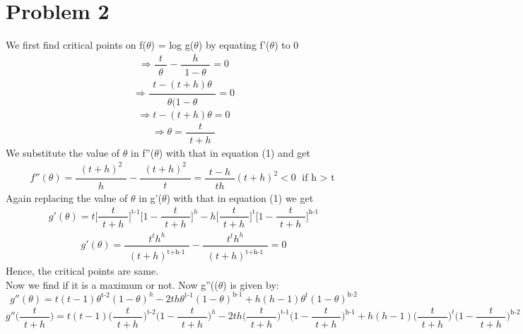 \documentclass[11pt, a4paper, fleqn]{article}
\begin{document}
\section{Problem 2}
We first find critical points on f($\theta$) = log g($\theta$) by equating f'($\theta$) to 0
\begin{equation*}
\Rightarrow \frac{\substack{t}}{\substack{\theta}} - \frac{\substack{h}}{\substack{1 - \theta}} = 0
\end{equation*}
\begin{equation*}
\Rightarrow \frac{\substack{t - (t+h)\theta}}{\substack{\theta (1-\theta}} = 0
\end{equation*}
\begin{equation*}
\Rightarrow t-(t+h)\theta = 0
\end{equation*}
\begin{equation}
\Rightarrow \theta = \frac{\substack{t}}{\substack{t+h}}
\end{equation}
We substitute the value of $\theta$ in f''($\theta$) with that in equation (1) and get
\begin{equation*}
f''(\theta)= \frac{\substack{(t+h)^2}}{\substack{h}} - \frac{\substack{(t+h)^2}}{\substack{t}} = 
\frac{\substack{t-h}}{\substack{th}} (t+h)^2 < 0          \text{     if h $>$ t}
\end{equation*}
Again replacing the value of $\theta$ in g'($\theta$) with that in equation (1) we get
\begin{equation*}
g'(\theta)=t \Big[\frac{\substack{t}}{\substack{t+h}}\Big]^\text{t-1} \Big [ 1 - \frac{\substack{t}}{\substack{t+h}} \Big]^h
- h \Big[\frac{\substack{t}}{\substack{t+h}}\Big]^\text{t} \Big [ 1 - \frac{\substack{t}}{\substack{t+h}} \Big]^\text{h-1}
\end{equation*}
\begin{equation}
g'(\theta)=\frac{\substack{t^t h^h}}{\substack{(t+h)^\text{t+h-1}}} - \frac{\substack{t^t h^h}}{\substack{(t+h)^\text{t+h-1}}} = 0
\end{equation}
Hence, the critical points are same.\\
Now we find if it is a maximum or not.
\newpage
Now g''(($\theta$) is given by:
\begin{equation*}
g''(\theta)=t(t-1) \theta^\text{t-2} (1-\theta)^h -2th \theta^\text{t-1} (1 - \theta)^\text{h-1} + h(h-1) \theta^t (1 - \theta)^\text{h-2}
\end{equation*}
\begin{equation*}
g''\Big(\frac{\substack{t}}{\substack{t+h}}\Big)=
t(t-1) \Big(\frac{\substack{t}}{\substack{t+h}}\Big)^\text{t-2} \Big(1-\frac{\substack{t}}{\substack{t+h}}\Big)^h 
-2th \Big(\frac{\substack{t}}{\substack{t+h}}\Big)^\text{t-1} \Big(1-\frac{\substack{t}}{\substack{t+h}}\Big)^\text{h-1} 
+ h(h-1) \Big(\frac{\substack{t}}{\substack{t+h}}\Big)^t \Big(1-\frac{\substack{t}}{\substack{t+h}}\Big)^\text{h-2}
\end{equation*}
\end{document}
